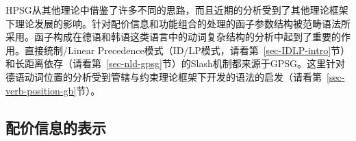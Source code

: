 HPSG从其他理论中借鉴了许多不同的思路，而且近期的分析受到了其他理论框架下理论发展的影响。针对配价信息和功能组合的处理的函子参数结构被范畴语法所采用\indexcg 。函子构成在德语和韩语这类语言中的动词复杂结构的分析中起到了重要的作用。直接统制/Linear Precedence模式（ID/LP模式，请看第~\ref{sec-IDLP-intro}节）和长距离依存（请看第~\ref{sec-nld-gpsg}节）的Slash机制都来源于GPSG\indexgpsg 。这里针对德语动词位置的分析受到管辖与约束理论\indexgb 框架下开发的语法的启发（请看第~\ref{sec-verb-position-gb}节）。

\subsection{配价信息的表示}

